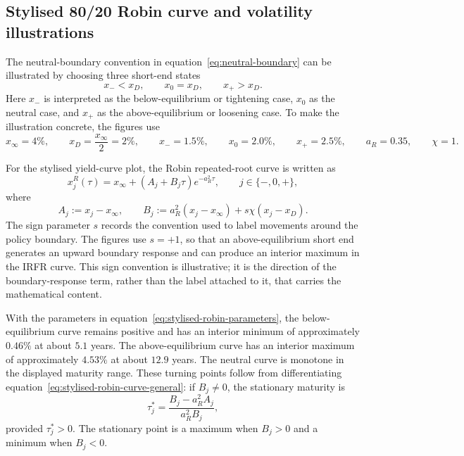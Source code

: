 \documentclass[11pt]{article}
\numberwithin{equation}{section}
\begin{document}
\subsection{Stylised 80/20 Robin curve and volatility illustrations}

The neutral-boundary convention in equation~\eqref{eq:neutral-boundary} can be illustrated by choosing three short-end states
\begin{equation}
\label{eq:stylised-robin-states}
x_-<x_D,
\qquad
x_0=x_D,
\qquad
x_+>x_D.
\end{equation}
Here $x_-$ is interpreted as the below-equilibrium or tightening case, $x_0$ as the neutral case, and $x_+$ as the above-equilibrium or loosening case. To make the illustration concrete, the figures use
\begin{equation}
\label{eq:stylised-robin-parameters}
x_\infty=4\%,
\qquad
x_D=\frac{x_\infty}{2}=2\%,
\qquad
x_-=1.5\%,
\qquad
x_0=2.0\%,
\qquad
x_+=2.5\%,
\qquad
a_R=0.35,
\qquad
\chi=1.
\end{equation}

For the stylised yield-curve plot, the Robin repeated-root curve is written as
\begin{equation}
\label{eq:stylised-robin-curve-general}
x^R_j(\tau)
=
x_\infty+(A_j+B_j\tau)e^{-a_R^2\tau},
\qquad j\in\{-,0,+\},
\end{equation}
where
\begin{equation}
\label{eq:stylised-robin-ab}
A_j:=x_j-x_\infty,
\qquad
B_j:=a_R^2(x_j-x_\infty)+s\chi(x_j-x_D).
\end{equation}
The sign parameter $s$ records the convention used to label movements around the policy boundary. The figures use $s=+1$, so that an above-equilibrium short end generates an upward boundary response and can produce an interior maximum in the IRFR curve. This sign convention is illustrative; it is the direction of the boundary-response term, rather than the label attached to it, that carries the mathematical content.

With the parameters in equation~\eqref{eq:stylised-robin-parameters}, the below-equilibrium curve remains positive and has an interior minimum of approximately $0.46\%$ at about $5.1$ years. The above-equilibrium curve has an interior maximum of approximately $4.53\%$ at about $12.9$ years. The neutral curve is monotone in the displayed maturity range. These turning points follow from differentiating equation~\eqref{eq:stylised-robin-curve-general}: if $B_j\neq 0$, the stationary maturity is
\begin{equation}
\label{eq:stylised-robin-turning-point}
\tau^*_j=
\frac{B_j-a_R^2A_j}{a_R^2B_j},
\end{equation}
provided $\tau^*_j>0$. The stationary point is a maximum when $B_j>0$ and a minimum when $B_j<0$.
\end{document}
